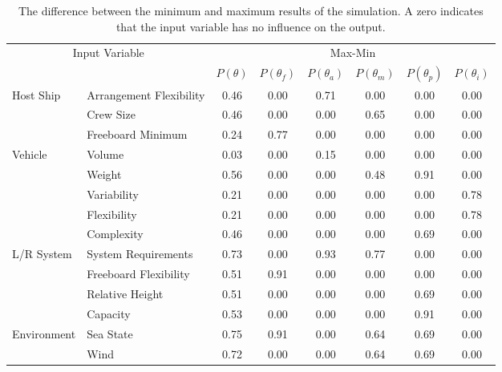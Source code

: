 \documentclass{svproc}
\begin{document}
\begin{table}[!htb]
\begin{adjustwidth}{-0.5cm}{-.5cm}
\begin{center}
\caption{The difference between the minimum and maximum results of the simulation. A zero indicates that the input variable has no influence on the output.}
\begin{tabular}{l l | c c c c c c}
\hline
\multicolumn{2}{c}{Input Variable} & \multicolumn{6}{c}{Max-Min}         \\
& & $P(\theta)$ & $P(\theta_f)$ & $P(\theta_a)$ & $P(\theta_m)$ & $P(\theta_p)$ & $P(\theta_i)$\\
\hline
Host Ship   & Arrangement Flexibility & 0.46 & 0.00 & 0.71 & 0.00 & 0.00 & 0.00 \\
            & Crew Size               & 0.46 & 0.00 & 0.00 & 0.65 & 0.00 & 0.00 \\
            & Freeboard Minimum       & 0.24 & 0.77 & 0.00 & 0.00 & 0.00 & 0.00 \\
Vehicle     & Volume                  & 0.03 & 0.00 & 0.15 & 0.00 & 0.00 & 0.00 \\
            & Weight                  & 0.56 & 0.00 & 0.00 & 0.48 & 0.91 & 0.00 \\
            & Variability             & 0.21 & 0.00 & 0.00 & 0.00 & 0.00 & 0.78 \\
            & Flexibility             & 0.21 & 0.00 & 0.00 & 0.00 & 0.00 & 0.78 \\
            & Complexity              & 0.46 & 0.00 & 0.00 & 0.00 & 0.69 & 0.00 \\
L/R System  & System Requirements     & 0.73 & 0.00 & 0.93 & 0.77 & 0.00 & 0.00 \\
            & Freeboard Flexibility   & 0.51 & 0.91 & 0.00 & 0.00 & 0.00 & 0.00 \\
            & Relative Height         & 0.51 & 0.00 & 0.00 & 0.00 & 0.69 & 0.00 \\
            & Capacity                & 0.53 & 0.00 & 0.00 & 0.00 & 0.91 & 0.00 \\
Environment & Sea State               & 0.75 & 0.91 & 0.00 & 0.64 & 0.69 & 0.00 \\
            & Wind                    & 0.72 & 0.00 & 0.00 & 0.64 & 0.69 & 0.00 \\
\hline
\end{tabular}
\label{table:diff}
\end{center}
\end{adjustwidth} 
\end{table}
\end{document}

